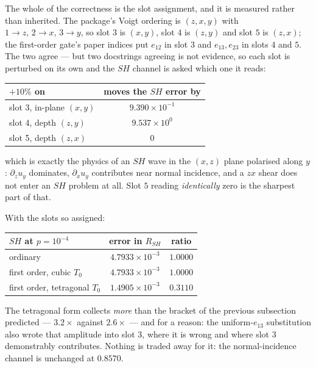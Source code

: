 \documentclass[11pt,a4paper]{article}
\begin{document}
The whole of the correctness is the slot assignment, and it is measured rather
than inherited.  The package's Voigt ordering is $(z,x,y)$ with
$1\!\to\!z,\,2\!\to\!x,\,3\!\to\!y$, so slot $3$ is $(x,y)$, slot $4$ is $(z,y)$
and slot $5$ is $(z,x)$; the first-order gate's paper indices put $e_{12}$ in
slot $3$ and $e_{13}, e_{23}$ in slots $4$ and $5$.  The two agree --- but two
docstrings agreeing is not evidence, so each slot is perturbed on its own and
the $SH$ channel is asked which one it reads:
\begin{center}
\begin{tabular}{lc}
\toprule
$+10\%$ on & moves the $SH$ error by\\
\midrule
slot 3, in-plane $(x,y)$ & $9.390\times10^{-1}$\\
slot 4, depth $(z,y)$    & $9.537\times10^{0}$\\
slot 5, depth $(z,x)$    & $0$\\
\bottomrule
\end{tabular}
\end{center}
which is exactly the physics of an $SH$ wave in the $(x,z)$ plane polarised along
$y$: $\partial_z u_y$ dominates, $\partial_x u_y$ contributes near normal
incidence, and a $zx$ shear does not enter an $SH$ problem at all.  Slot $5$
reading \emph{identically} zero is the sharpest part of that.

With the slots so assigned:
\begin{center}
\begin{tabular}{lcc}
\toprule
$SH$ at $p = 10^{-4}$ & error in $R_{SH}$ & ratio\\
\midrule
ordinary                        & $4.7933\times10^{-3}$ & $1.0000$\\
first order, cubic $T_0$        & $4.7933\times10^{-3}$ & $1.0000$\\
first order, tetragonal $T_0$   & $1.4905\times10^{-3}$ & $\mathbf{0.3110}$\\
\bottomrule
\end{tabular}
\end{center}
The tetragonal form collects \emph{more} than the bracket of the previous
subsection predicted --- $3.2\times$ against $2.6\times$ --- and for a reason:
the uniform-$e_{13}$ substitution also wrote that amplitude into slot $3$, where
it is wrong and where slot $3$ demonstrably contributes.  Nothing is traded away
for it: the normal-incidence channel is unchanged at $0.8570$.
\end{document}
